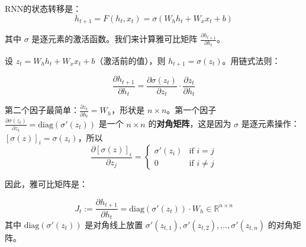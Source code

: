 RNN的状态转移是：
\begin{equation}
    h_{t+1} = F(h_t, x_t) = \sigma(W_h h_t + W_x x_t + b)
\end{equation}

其中 $\sigma$ 是逐元素的激活函数。我们来计算雅可比矩阵 $\frac{\partial h_{t+1}}{\partial h_t}$。

设 $z_t = W_h h_t + W_x x_t + b$（激活前的值），则 $h_{t+1} = \sigma(z_t)$。用链式法则：

\begin{equation}
    \frac{\partial h_{t+1}}{\partial h_t} = \frac{\partial \sigma(z_t)}{\partial z_t} \cdot \frac{\partial z_t}{\partial h_t}
\end{equation}

第二个因子最简单：$\frac{\partial z_t}{\partial h_t} = W_h$，形状是 $n \times n$。第一个因子 $\frac{\partial \sigma(z_t)}{\partial z_t} = \text{diag}(\sigma'(z_t))$ 是一个 $n \times n$ 的\textbf{对角矩阵}，这是因为 $\sigma$ 是逐元素操作：$[\sigma(z)]_i = \sigma(z_i)$，所以
\begin{equation}
    \frac{\partial [\sigma(z)]_i}{\partial z_j} = \begin{cases}
        \sigma'(z_i) & \text{if } i = j \\
        0 & \text{if } i \neq j
    \end{cases}
\end{equation}

因此，雅可比矩阵是：

\begin{keyformula}[title=RNN的雅可比矩阵]
\begin{equation}
    J_t := \frac{\partial h_{t+1}}{\partial h_t} = \text{diag}(\sigma'(z_t)) \cdot W_h \in \mathbb{R}^{n \times n}
\end{equation}
其中 $\text{diag}(\sigma'(z_t))$ 是对角线上放置 $\sigma'(z_{t,1}), \sigma'(z_{t,2}), \ldots, \sigma'(z_{t,n})$ 的对角矩阵。
\end{keyformula}


